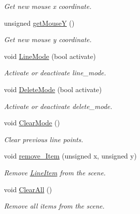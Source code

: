 \begin{DoxyCompactItemize}
\begin{DoxyCompactList}\small\item\em Get new mouse x coordinate. \end{DoxyCompactList}\item 
unsigned \mbox{\hyperlink{classOwnGraphicsScene_a3fd2942e9930fc2dda41844622dc8a35}{get\+MouseY}} ()
\begin{DoxyCompactList}\small\item\em Get new mouse y coordinate. \end{DoxyCompactList}\item 
void \mbox{\hyperlink{classOwnGraphicsScene_a6b7e69131827f0ae64626af378ff9974}{Line\+Mode}} (bool activate)
\begin{DoxyCompactList}\small\item\em Activate or deactivate line\+\_\+mode. \end{DoxyCompactList}\item 
void \mbox{\hyperlink{classOwnGraphicsScene_aca454942ecf6c472d020e063862464d4}{Delete\+Mode}} (bool activate)
\begin{DoxyCompactList}\small\item\em Activate or deactivate delete\+\_\+mode. \end{DoxyCompactList}\item 
\mbox{\label{classOwnGraphicsScene_a31221ca321dde1e684f9cdf23dd1c225}} 
void \mbox{\hyperlink{classOwnGraphicsScene_a31221ca321dde1e684f9cdf23dd1c225}{Clear\+Mode}} ()
\begin{DoxyCompactList}\small\item\em Clear previous line points. \end{DoxyCompactList}\item 
void \mbox{\hyperlink{classOwnGraphicsScene_a5b4b466a697f83c23294a80067edac23}{remove\+\_\+\+Item}} (unsigned x, unsigned y)
\begin{DoxyCompactList}\small\item\em Remove \mbox{\hyperlink{classLineItem}{Line\+Item}} from the scene. \end{DoxyCompactList}\item 
\mbox{\label{classOwnGraphicsScene_a8d133a1b72a853772d2d89da4d4e1afa}} 
void \mbox{\hyperlink{classOwnGraphicsScene_a8d133a1b72a853772d2d89da4d4e1afa}{Clear\+All}} ()
\begin{DoxyCompactList}\small\item\em Remove all items from the scene. \end{DoxyCompactList}\item 

\end{DoxyCompactItemize}
